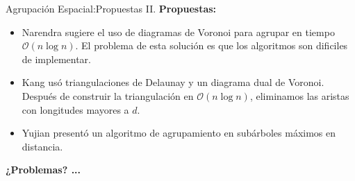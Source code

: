 
\begin{frame}[fragile]{Agrupación Espacial:}{Propuestas II.}
  \textbf{Propuestas:}
  \begin{itemize}
  \item Narendra sugiere el uso de diagramas de Voronoi para agrupar en
    tiempo $\mathcal{O}(n \log n)$. El problema de esta solución es que
    los algoritmos son dificiles de implementar.
  \item Kang usó triangulaciones de Delaunay y un diagrama dual de Voronoi.
    Después de construir la triangulación en $\mathcal{O}(n \log n)$, eliminamos
    las aristas con longitudes mayores a $d$.
  \item Yujian presentó un algoritmo de agrupamiento en subárboles máximos en
    distancia.
  \end{itemize}
  \textbf{¿Problemas? ...}
\end{frame}
